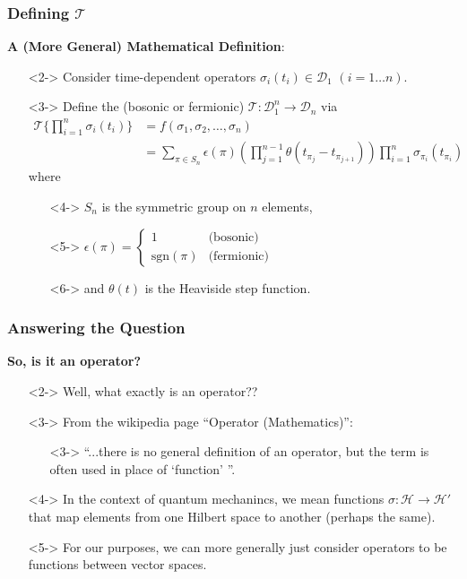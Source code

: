\documentclass{beamer}
\begin{document}
\begin{frame}
    \frametitle{Defining $\mathscr{T}$}
    \alert{\textbf{A (More General) Mathematical Definition}:}
    \begin{itemize}
        \item[\textbullet]<2-> Consider time-dependent operators $\sigma_i(t_i)\in\mathcal{D}_1$ $(i=1\ldots n)$.
        \item[\textbullet]<3-> Define the (bosonic or fermionic) $\mathscr{T}:\mathcal{D}_1^n\to \mathcal{D}_n$ via
        \begin{align*}
            \mathscr{T}\{\prod_{i=1}^{n} \sigma_i(t_i)\} &= f(\sigma_1, \sigma_2, \ldots, \sigma_n) \\
            &= \sum_{\pi\in S_n}\epsilon(\pi)\left(\prod_{j=1}^{n-1}\theta(t_{\pi_j} - t_{\pi_{j+1}})\right)\prod_{i=1}^n\sigma_{\pi_i}(t_{\pi_i})
        \end{align*}
        where 
        \begin{itemize}
            \item[\textbullet]<4-> $S_n$ is the symmetric group on $n$ elements,
            \item[\textbullet]<5-> $\epsilon(\pi) = \begin{cases}
                1 & \text{(bosonic)} \\
                \text{sgn}(\pi) & \text{(fermionic)}
             \end{cases}$
            \item[\textbullet]<6-> and $\theta(t)$ is the Heaviside step function.
        \end{itemize}
    \end{itemize}
\end{frame}

\begin{frame}
\frametitle{Answering the Question}
\alert{\textbf{So, is it an operator?}}
\begin{itemize}
    \item[\textbullet]<2-> Well, what exactly is an operator??
    \item[\textbullet]<3-> From the wikipedia page ``Operator (Mathematics)'': 
    \begin{itemize}
        \item[\textbullet]<3-> ``...there is no general definition of an operator, but the term is often used in place of `function' ''.
    \end{itemize}
    \item[\textbullet]<4-> In the context of quantum mechanincs, we mean functions $\sigma: \mathcal{H} \to \mathcal{H}'$ that map elements from one Hilbert space to another (perhaps the same).
    \item[\textbullet]<5-> For our purposes, we can more generally just consider operators to be functions between vector spaces.
\end{itemize}

\end{frame}
\end{document}

